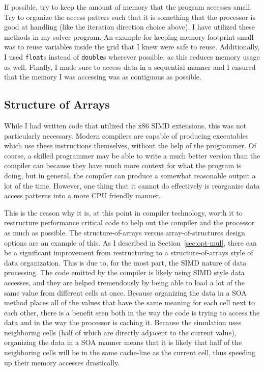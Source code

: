 If possible, try to keep the amount of memory that the program accesses small. Try to organize the access patters such that it is
something that the processor is good at handling (like the iteration direction choice above). I have utilized these methods in my
solver program. An example for keeping memory footprint small was to reuse variables inside the grid that I knew were safe to reuse.
Additionally, I used \texttt{float}s instead of \texttt{double}s wherever possible, as this reduces memory usage as well. Finally,
I made sure to access data in a sequential manner and I ensured that the memory I was accessing was as contiguous as possible.

\subsection{Structure of Arrays}

While I had written code that utilized the x86 SIMD extensions, this was not particularly necessary. Modern compilers are capable
of producing executables which use these instructions themselves, without the help of the programmer. Of course, a skilled programmer
may be able to write a much better version than the compiler can because they have much more context for what the program is doing,
but in general, the compiler can produce a somewhat reasonable output a lot of the time. However, one thing that it cannot do
effectively is reorganize data access patterns into a more CPU friendly manner.

This is the reason why it is, at this point in compiler technology, worth it to restructure performance critical code to help out
the compiler and the processor as much as possible. The structure-of-arrays versus array-of-structures design options are an example
of this. As I described in Section~\ref{sec:opt-mul}, there can be a significant improvement from restructuring to a structure-of-arrays
style of data organization. This is due to, for the most part, the SIMD nature of data processing. The code emitted by the compiler
is likely using SIMD style data accesses, and they are helped tremendously by being able to load a lot of the same value from different
cells at once. Because organizing the data in a SOA method places all of the values that have the same meaning for each cell next to
each other, there is a benefit seen both in the way the code is trying to access the data and in the way the processor is caching it.
Because the simulation uses neighboring cells (half of which are directly adjacent to the current value), organizing the data
in a SOA manner means that it is likely that half of the neighboring cells will be in the same cache-line as the current cell, thus
speeding up their memory accesses drastically.

